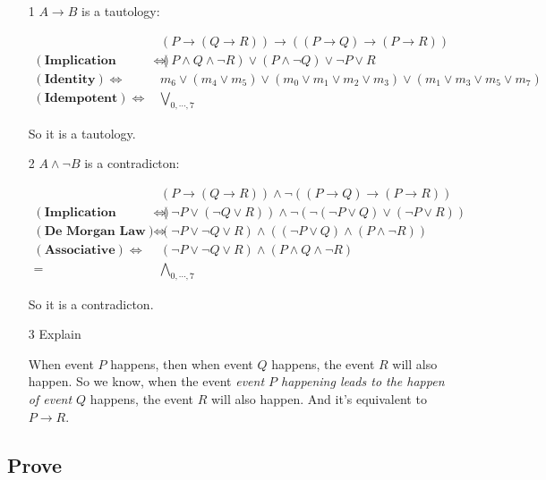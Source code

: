 \documentclass{article}
\begin{document}
\begin{itemize}
    \item [1] $A\rightarrow B$ is a tautology:

        $$
        \begin{aligned}
            &(P\rightarrow(Q\rightarrow R))\rightarrow((P\rightarrow Q)\rightarrow(P\rightarrow R))\\
            (\textbf{Implication Equivalence})\Leftrightarrow&(P\wedge Q\wedge\lnot R)\vee(P\wedge\lnot Q)\vee\lnot P\vee R\\
            (\textbf{Identity})\Leftrightarrow&m_6\vee(m_4\vee m_5)\vee(m_0\vee m_1\vee m_2\vee m_3)\vee(m_1\vee m_3\vee m_5\vee m_7)\\
            (\textbf{Idempotent})\Leftrightarrow& \bigvee_{0,\cdots,7}
        \end{aligned}
        $$

        So it is a tautology.

    \item [2] $A\wedge\lnot B$ is a contradicton:
    
        $$
        \begin{aligned}
            &(P\rightarrow(Q\rightarrow R))\wedge\lnot((P\rightarrow Q)\rightarrow(P\rightarrow R))\\
            (\textbf{Implication Equivalence})\Leftrightarrow&(\lnot P\vee(\lnot Q\vee R))\wedge\lnot(\lnot(\lnot P\vee Q)\vee(\lnot P\vee R))\\
            (\textbf{De Morgan Law})\Leftrightarrow&(\lnot P\vee\lnot Q\vee R)\wedge((\lnot P\vee Q)\wedge(P\wedge\lnot R))\\
            (\textbf{Associative})\Leftrightarrow&(\lnot P\vee\lnot Q\vee R)\wedge(P\wedge Q\wedge \lnot R)\\
            =&\bigwedge_{0,\cdots,7}
        \end{aligned}
        $$

        So it is a contradicton.

    \item [3] Explain
    
    When event $P$ happens, then when event $Q$ happens, the event $R$ will also happen. So we know, when the event \textit{event $P$ happening leads to the happen of event $Q$} happens, the event $R$ will also happen. And it's equivalent to $P\rightarrow R$.
\end{itemize}

\subsection{Prove}
\end{document}

